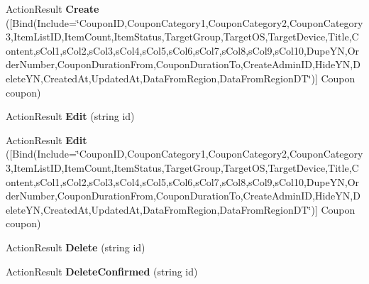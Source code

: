 \begin{DoxyCompactItemize}
\item 
Action\+Result {\bfseries Create} (\mbox{[}Bind(Include=\char`\"{}Coupon\+ID,Coupon\+Category1,Coupon\+Category2,Coupon\+Category3,Item\+List\+ID,Item\+Count,Item\+Status,Target\+Group,Target\+OS,Target\+Device,Title,Content,s\+Col1,s\+Col2,s\+Col3,s\+Col4,s\+Col5,s\+Col6,s\+Col7,s\+Col8,s\+Col9,s\+Col10,Dupe\+YN,Order\+Number,Coupon\+Duration\+From,Coupon\+Duration\+To,Create\+Admin\+ID,Hide\+YN,Delete\+YN,Created\+At,Updated\+At,Data\+From\+Region,Data\+From\+Region\+DT\char`\"{})\mbox{]} Coupon coupon)\hypertarget{class_cloud_bread_admin_web_1_1_controllers_1_1_coupons_controller_a09a4128160e5af4df99acba3cb1ac868}{}\label{class_cloud_bread_admin_web_1_1_controllers_1_1_coupons_controller_a09a4128160e5af4df99acba3cb1ac868}

\item 
Action\+Result {\bfseries Edit} (string id)\hypertarget{class_cloud_bread_admin_web_1_1_controllers_1_1_coupons_controller_a39373b6a5ca168ebb0a343e86d75f317}{}\label{class_cloud_bread_admin_web_1_1_controllers_1_1_coupons_controller_a39373b6a5ca168ebb0a343e86d75f317}

\item 
Action\+Result {\bfseries Edit} (\mbox{[}Bind(Include=\char`\"{}Coupon\+ID,Coupon\+Category1,Coupon\+Category2,Coupon\+Category3,Item\+List\+ID,Item\+Count,Item\+Status,Target\+Group,Target\+OS,Target\+Device,Title,Content,s\+Col1,s\+Col2,s\+Col3,s\+Col4,s\+Col5,s\+Col6,s\+Col7,s\+Col8,s\+Col9,s\+Col10,Dupe\+YN,Order\+Number,Coupon\+Duration\+From,Coupon\+Duration\+To,Create\+Admin\+ID,Hide\+YN,Delete\+YN,Created\+At,Updated\+At,Data\+From\+Region,Data\+From\+Region\+DT\char`\"{})\mbox{]} Coupon coupon)\hypertarget{class_cloud_bread_admin_web_1_1_controllers_1_1_coupons_controller_a415857b2d9920c1a983dcb7c5e0a8907}{}\label{class_cloud_bread_admin_web_1_1_controllers_1_1_coupons_controller_a415857b2d9920c1a983dcb7c5e0a8907}

\item 
Action\+Result {\bfseries Delete} (string id)\hypertarget{class_cloud_bread_admin_web_1_1_controllers_1_1_coupons_controller_afd61a6573b0021000457cdb396553d5f}{}\label{class_cloud_bread_admin_web_1_1_controllers_1_1_coupons_controller_afd61a6573b0021000457cdb396553d5f}

\item 
Action\+Result {\bfseries Delete\+Confirmed} (string id)\hypertarget{class_cloud_bread_admin_web_1_1_controllers_1_1_coupons_controller_a7e650ebeb88a7019d2f5b9bd1dea2a63}{}\label{class_cloud_bread_admin_web_1_1_controllers_1_1_coupons_controller_a7e650ebeb88a7019d2f5b9bd1dea2a63}

\end{DoxyCompactItemize}
